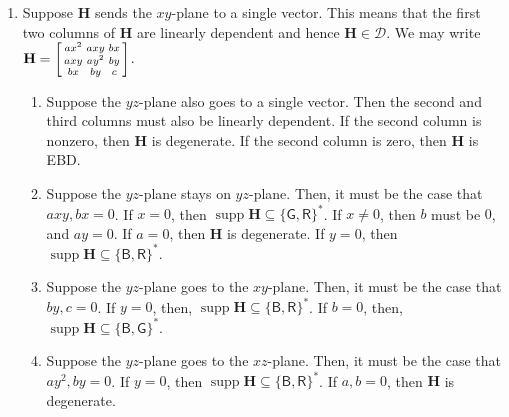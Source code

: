 \documentclass[11pt]{article}
\DeclareMathOperator{\supp}{supp}
\newcommand{\db}{\mathsf{B}}
\newcommand{\dg}{\mathsf{G}}
\newcommand{\dr}{\mathsf{R}}
\newcommand{\strspt}{\textsf{EBD}\xspace}
\begin{document}
\begin{enumerate}
    \item 
Suppose $\mathbf{H}$ sends the $xy$-plane to a single vector.
This means that the first two columns of $\mathbf{H}$ are linearly dependent and hence $\mathbf{H} \in \mathcal{D}$.
We may write $\mathbf{H} = \begin{bsmallmatrix}
  ax^2 & axy & bx \\
  axy & ay^2 & by \\
  bx & by & c
\end{bsmallmatrix}$.
\begin{enumerate}
\item 
    Suppose the $yz$-plane also goes to a single vector. 
    Then the second and third columns must also be linearly dependent.
    If the second column is nonzero, then $\mathbf{H}$ is degenerate.
    If the second column is zero, then $\mathbf{H}$ is \strspt.

  \item Suppose the $yz$-plane stays on $yz$-plane.
    Then, it must be the case that $axy, bx = 0$.
    If $x = 0$, then $\supp \mathbf{H} \subseteq \{\dg, \dr\}^*$.
    If $x \ne 0$, then $b$ must be $0$, and $ay = 0$.
    If $a = 0$, then $\mathbf{H}$ is degenerate.
    If $y = 0$, then $\supp \mathbf{H} \subseteq \{\db, \dr\}^*$.

  \item Suppose the $yz$-plane goes to the $xy$-plane.
    Then, it must be the case that $by, c = 0$.
    If $y = 0$, then, $\supp \mathbf{H} \subseteq \{\db, \dr\}^*$.
    If $b = 0$, then, $\supp \mathbf{H} \subseteq \{\db, \dg\}^*$.

  \item Suppose the $yz$-plane goes to the $xz$-plane.
    Then, it must be the case that $a y^2, by = 0$.
    If $y = 0$, then $\supp \mathbf{H} \subseteq \{\db, \dr\}^*$.
    If $a, b = 0$, then $\mathbf{H}$ is degenerate.
\end{enumerate}


\end{enumerate}
\end{document}
